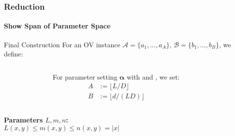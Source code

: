 \begin{frame}[t]
\frametitle{Reduction}
\framesubtitle{Show Span of Parameter Space}

\begin{exampleblock}{Final Construction}
For an OV instance $\mathcal{A} = \{a_1, \ldots, a_A\}$, $\mathcal{B} = \{b_1, \ldots, b_B\}$, we define:

\vspace{2ex}
\begin{columns}

\begin{figure}
	\centering
\end{figure}

For parameter setting $\mathbf{\alpha}$ with  and , we set:
\begin{align*}
	A &:= \lfloor L/D \rfloor \\
	B &:= \lfloor d/(LD) \rfloor
\end{align*}

\end{columns}
\end{exampleblock}

\pause


\begin{columns}
\setlength{\parskip}{1em}
\textbf{Parameters $L,m,n$:}\\
\vspace{1ex}
$L(x,y) \leq m(x,y) \leq n(x,y) = |x|$ 





\end{columns}
\end{frame}
